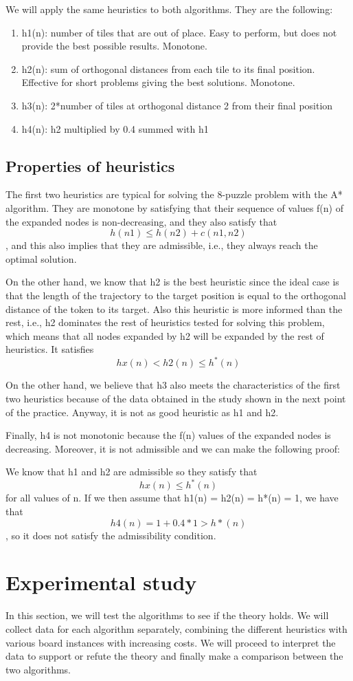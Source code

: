 \documentclass[runningheads]{llncs}
\begin{document}
We will apply the same heuristics to both algorithms. They are the following:
\begin{enumerate}
    \item h1(n): number of tiles that are out of place. Easy to perform, but does not provide the best possible results. Monotone.
    \item h2(n): sum of orthogonal distances from each tile to its final position. Effective for short problems giving the best solutions. Monotone.
    \item h3(n): 2*number of tiles at orthogonal distance 2 from their final position
    \item h4(n): h2 multiplied by 0.4 summed with h1
\end{enumerate}
\subsection{Properties of heuristics}
The first two heuristics are typical for solving the 8-puzzle problem with 
the A* algorithm. They are monotone by satisfying that their sequence of 
values f(n) of the expanded nodes is non-decreasing, and they also satisfy 
that $$h(n1) \leq h(n2) + c(n1,n2)$$, and this also implies that they are admissible, 
i.e., they always reach the optimal solution.

On the other hand, we know that h2 is the best heuristic since the ideal 
case is that the length of the trajectory to the target position is equal 
to the orthogonal distance of the token to its target. Also this heuristic 
is more informed than the rest, i.e., h2 dominates the rest of heuristics 
tested for solving this problem, which means that all nodes expanded by h2 
will be expanded by the rest of heuristics. It satisfies $$hx(n) < h2(n) \leq h^*(n)$$

On the other hand, we believe that h3 also meets the characteristics 
of the first two heuristics because of the data obtained in the study 
shown in the next point of the practice. Anyway, it is not as good heuristic as h1 and h2.

Finally, h4 is not monotonic because the f(n) values of the expanded 
nodes is decreasing. Moreover, it is not admissible and we can make 
the following proof:

We know that h1 and h2 are admissible so they satisfy that 
$$hx(n) \leq h^*(n)$$ for all values of n. If we then assume that 
h1(n) = h2(n) = h*(n) = 1, we have that $$h4(n) = 1 + 0.4*1 > h*(n)$$, 
so it does not satisfy the admissibility condition. 
\section{Experimental study}
In this section, we will test the algorithms to see if the theory holds.
We will collect data for each algorithm separately, combining the different
heuristics with various board instances with increasing costs. We will proceed to
interpret the data to support or refute the theory and finally make a comparison between the two algorithms.
\end{document}
